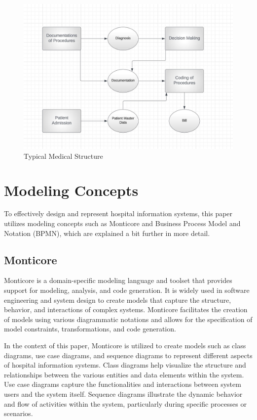 \begin{figure}[ht!]
\begin{center}\includegraphics[width=12cm]{src/pic/Typical_Medical_Procedure.jpg}\end{center}
\caption{Typical Medical Structure \cite{Ben20}}
\label{TMP}
\end{figure}


\section{Modeling Concepts}
To effectively design and represent hospital information systems, this paper utilizes modeling concepts such as Monticore and Business Process Model and Notation (BPMN), which are explained a bit further in more detail.

\subsection{Monticore}

Monticore is a domain-specific modeling language and toolset that provides support for modeling, analysis, and code generation. It is widely used in software engineering and system design to create models that capture the structure, behavior, and interactions of complex systems. Monticore facilitates the creation of models using various diagrammatic notations and allows for the specification of model constraints, transformations, and code generation. \cite{Monticore:Framework}

In the context of this paper, Monticore is utilized to create models such as class diagrams, use case diagrams, and sequence diagrams to represent different aspects of hospital information systems. Class diagrams help visualize the structure and relationships between the various entities and data elements within the system. Use case diagrams capture the functionalities and interactions between system users and the system itself. Sequence diagrams illustrate the dynamic behavior and flow of activities within the system, particularly during specific processes or scenarios. 

